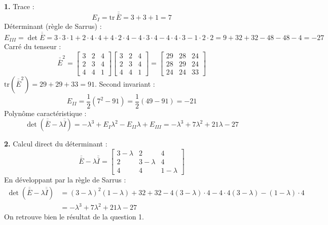 \documentclass[12pt,a4paper]{article}
\begin{document}
\begin{boitecorrige}
\textbf{1.} Trace :
\[
E_I = \mathrm{tr}\,\overline{\overline{E}} = 3+3+1 = 7
\]
Déterminant (règle de Sarrus) :
\[
E_{III} = \det\overline{\overline{E}} = 3\cdot3\cdot1 + 2\cdot4\cdot4 + 4\cdot2\cdot4 - 4\cdot3\cdot4 - 4\cdot4\cdot3 - 1\cdot2\cdot2 = 9+32+32-48-48-4 = -27
\]
Carré du tenseur :
\[
\overline{\overline{E}}^2 = \begin{bmatrix}3&2&4\\2&3&4\\4&4&1\end{bmatrix}\begin{bmatrix}3&2&4\\2&3&4\\4&4&1\end{bmatrix} = \begin{bmatrix}29&28&24\\28&29&24\\24&24&33\end{bmatrix}
\]
$\mathrm{tr}(\overline{\overline{E}}^2) = 29+29+33 = 91$. Second invariant :
\[
E_{II} = \frac{1}{2}(7^2 - 91) = \frac{1}{2}(49-91) = -21
\]
Polynôme caractéristique :
\[
\det(\overline{\overline{E}}-\lambda\overline{\overline{I}}) = -\lambda^3 + E_I\lambda^2 - E_{II}\lambda + E_{III} = -\lambda^3 + 7\lambda^2 + 21\lambda - 27
\]

\textbf{2.} Calcul direct du déterminant :
\[
\overline{\overline{E}}-\lambda\overline{\overline{I}} = \begin{bmatrix}3-\lambda&2&4\\2&3-\lambda&4\\4&4&1-\lambda\end{bmatrix}
\]
En développant par la règle de Sarrus :
\begin{align*}
\det(\overline{\overline{E}}-\lambda\overline{\overline{I}}) &= (3-\lambda)^2(1-\lambda)+32+32 - 4(3-\lambda)\cdot4 - 4\cdot4(3-\lambda) - (1-\lambda)\cdot4\\
&= -\lambda^3 + 7\lambda^2 + 21\lambda - 27
\end{align*}
On retrouve bien le résultat de la question 1.


\end{boitecorrige}
\end{document}

